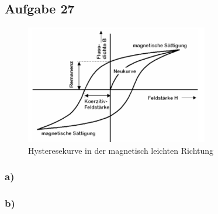 \newpage
\subsection*{Aufgabe 27}
\begin{figure}
  \centering
  \includegraphics[width=8cm]{aufgabe27a.png}
\caption{Hysteresekurve in der magnetisch leichten Richtung}
\end{figure}
\subsubsection*{a)}


\subsubsection*{b)}

